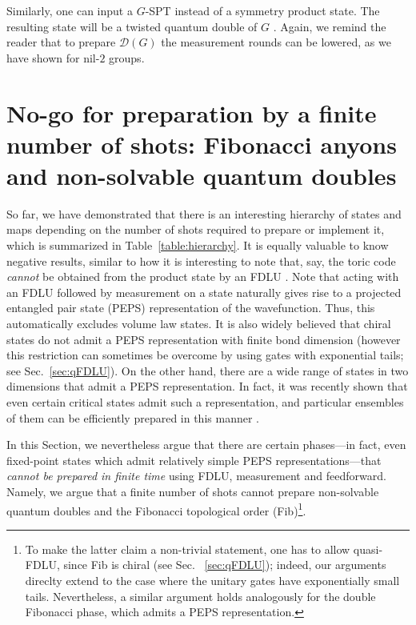 \documentclass[nofootinbib,prx,twocolumn,showpacs,superscriptaddress,notitlepage,amsmath,amssymb]{revtex4-2}
\theoremstyle{definition}
\begin{document}
Similarly, one can input a $G$-SPT instead of a symmetry product state. The resulting state will be a twisted quantum double of $G$ \cite{DijkgraafPasquierRoche91TQD,HuWanWu13TQD}. Again, we remind the reader that to prepare $\mathcal D(G)$ the measurement rounds can be lowered, as we have shown for nil-$2$ groups.




\section{No-go for preparation by a  finite number of shots: Fibonacci anyons and non-solvable quantum doubles}\label{sec:nonsolvable}

So far, we have demonstrated that there is an interesting hierarchy of states and maps depending on the number of shots required to prepare or implement it, which is summarized in Table~\ref{table:hierarchy}. It is equally valuable to know negative results, similar to how it is interesting to note that, say, the toric code \emph{cannot} be obtained from the product state by an FDLU \cite{BravyiHastingsVerstraete06}. Note that acting with an FDLU followed by measurement on a state naturally gives rise to a projected entangled pair state (PEPS) representation of the wavefunction. Thus, this automatically excludes volume law states. It is also widely believed that chiral states do not admit a PEPS representation with finite bond dimension\cite{kitaev_anyons_2005,DubailRead15,FK_CommProj2019,SK_CommProj2020} (however this restriction can sometimes be overcome by using gates with exponential tails; see Sec.~\ref{sec:qFDLU}). On the other hand, there are a wide range of states in two dimensions that admit a PEPS representation. In fact, it was recently shown that even certain critical states admit such a representation, and particular ensembles of them can be efficiently prepared in this manner \cite{Nishimoricat22,Lee22}.

In this Section, we nevertheless argue that there are certain phases---in fact, even fixed-point states which admit relatively simple PEPS representations---that \emph{cannot be prepared in finite time} using FDLU, measurement and feedforward. Namely, we argue that a finite number of shots cannot prepare non-solvable quantum doubles and the Fibonacci topological order (Fib)\footnote{To make the latter claim a non-trivial statement, one has to allow quasi-FDLU, since Fib is chiral (see Sec.~ \ref{sec:qFDLU}); indeed, our arguments direclty extend to the case where the unitary gates have exponentially small tails. Nevertheless, a similar argument holds analogously for the double Fibonacci phase, which admits a PEPS representation.}.
\end{document}
